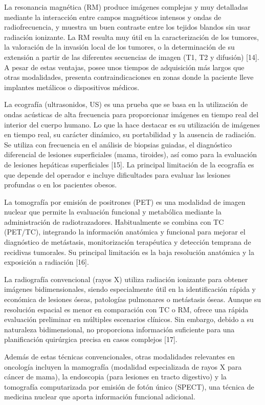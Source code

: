 La resonancia magnética (RM) produce imágenes complejas y muy detalladas mediante la interacción entre campos magnéticos intensos y ondas de radiofrecuencia, y muestra un buen contraste entre los tejidos blandos sin usar radiación ionizante. La RM resulta muy útil en la caracterización de los tumores, la valoración de la invasión local de los tumores, o la determinación de su extensión a partir de las diferentes secuencias de imagen (T1, T2 y difusión) [14]. A pesar de estas ventajas, posee unos tiempos de adquisición más largos que otras modalidades, presenta contraindicaciones en zonas donde la paciente lleve implantes metálicos o dispositivos médicos. 

La ecografía (ultrasonidos, US) es una prueba que se basa en la utilización de ondas acústicas de alta frecuencia para proporcionar imágenes en tiempo real del interior del cuerpo humano. Lo que la hace destacar es su utilización de imágenes en tiempo real, su carácter dinámico, su portabilidad y la ausencia de radiación. Se utiliza con frecuencia en el análisis de biopsias guiadas, el diagnóstico diferencial de lesiones superficiales (mama, tiroides), así como para la evaluación de lesiones hepáticas superficiales [15]. La principal limitación de la ecografía es que depende del operador e incluye dificultades para evaluar las lesiones profundas o en los pacientes obesos. 

La tomografía por emisión de positrones (PET) es una modalidad de imagen nuclear que permite la evaluación funcional y metabólica mediante la administración de radiotrazadores. Habitualmente se combina con TC (PET/TC), integrando la información anatómica y funcional para mejorar el diagnóstico de metástasis, monitorización terapéutica y detección temprana de recidivas tumorales. Su principal limitación es la baja resolución anatómica y la exposición a radiación [16]. 

La radiografía convencional (rayos X) utiliza radiación ionizante para obtener imágenes bidimensionales, siendo especialmente útil en la identificación rápida y económica de lesiones óseas, patologías pulmonares o metástasis óseas. Aunque su resolución espacial es menor en comparación con TC o RM, ofrece una rápida evaluación preliminar en múltiples escenarios clínicos. Sin embargo, debido a su naturaleza bidimensional, no proporciona información suficiente para una planificación quirúrgica precisa en casos complejos [17]. 

Además de estas técnicas convencionales, otras modalidades relevantes en oncología incluyen la mamografía (modalidad especializada de rayos X para cáncer de mama), la endoscopia (para lesiones en tracto digestivo) y la tomografía computarizada por emisión de fotón único (SPECT), una técnica de medicina nuclear que aporta información funcional adicional. 

